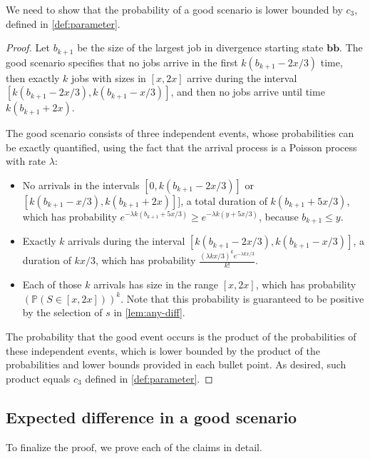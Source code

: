 \documentclass[acmsmall]{acmart}
\renewcommand{\P}[1]{\mathbb{P}(#1)}
\newcommand{\bb}{\boldsymbol{b}}
\newcommand{\bbb}{\bb\bb}
\begin{document}
We need to show that the probability of a good scenario is lower bounded by $c_3$, defined in \cref{def:parameter}.

\begin{proof}
Let $b_{k+1}$ be the size of the largest job in divergence starting state $\bbb$. The good scenario specifies that no jobs arrive in the first $k(b_{k+1}-2x/3)$ time,
    then exactly $k$ jobs with sizes in $[x, 2x]$ arrive during the interval
    $[k(b_{k+1}-2x/3), k(b_{k+1}-x/3)]$, and then no jobs arrive until time $k(b_{k+1}+2x)$.

The good scenario consists of three independent events, whose probabilities can be exactly quantified,
    using the fact that the arrival process is a Poisson process with rate $\lambda$:
    \begin{itemize}
        \item No arrivals in the intervals $[0, k(b_{k+1}-2x/3)]$ or $[k(b_{k+1}-x/3), k(b_{k+1}+2x)]]$,
        a total duration of $k(b_{k+1}+5x/3)$,
        which has probability $e^{-\lambda k(b_{k+1}+5x/3)} \ge e^{-\lambda k(y+5x/3)}$, because $b_{k+1} \le y$.
        \item Exactly $k$ arrivals during the interval $[k(b_{k+1}-2x/3), k(b_{k+1}-x/3)]$,
        a duration of $kx/3$, which has probability
        $\frac{(\lambda kx/3)^k e^{-\lambda kx/3}}{k!}$.
        \item Each of those $k$ arrivals has size in the range $[x, 2x]$, which has probability
        $(\P{S \in [x, 2x]})^k$. 
        Note that this probability is guaranteed to be positive by the selection of $s$
        in \cref{lem:any-diff}.
    \end{itemize}
    The probability that the good event occurs is the product of the probabilities of these independent events, which is lower bounded by the product of the probabilities and lower bounds provided in each bullet point. As desired, such product equals $c_3$ defined in \cref{def:parameter}.
\end{proof}


\subsection{Expected difference in a good scenario}
\label{ap:good-expectation}

To finalize the proof, we prove each of the claims in detail.
\end{document}

